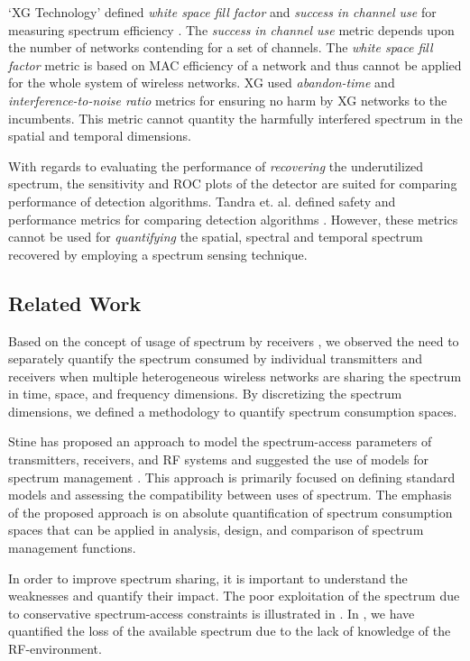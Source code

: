 \documentclass[journal,12pt,draftclsnofoot,onecolumn]{IEEEtran}
\begin{document}
`XG Technology' defined \textit{white space fill factor} and \textit{success in channel use} for measuring spectrum efficiency \cite{xgmetrics}. The \textit{success in channel use} metric depends upon the number of networks contending for a set of channels. The \textit{white space fill factor} metric is based on MAC efficiency of a network and thus cannot be applied for the whole system of wireless networks. XG used \textit{abandon-time} and \textit{interference-to-noise ratio} metrics for ensuring no harm by XG networks to the incumbents. This metric cannot quantity the harmfully interfered spectrum in the spatial and temporal dimensions.

With regards to evaluating the performance of \textit{recovering} the underutilized spectrum, the sensitivity and ROC plots of the detector are suited for comparing performance of detection algorithms. Tandra et. al. defined safety and performance metrics for comparing detection algorithms \cite{tandra_metrics}. However, these metrics cannot be used for \textit{quantifying} the spatial, spectral and temporal spectrum recovered by employing a spectrum sensing technique. 

\subsection{Related Work}
Based on the concept of usage of spectrum by receivers \cite{itumetrics}, we observed the need to separately quantify the spectrum consumed by individual transmitters and receivers when multiple heterogeneous wireless networks are sharing the spectrum in time, space, and frequency dimensions. By discretizing the spectrum dimensions, we defined a methodology to quantify spectrum consumption spaces. 

Stine has proposed an approach to model the spectrum-access parameters of transmitters, receivers, and RF systems and suggested the use of models for spectrum management \cite{crt_stine}. This approach is primarily focused on defining standard models and assessing the compatibility between uses of spectrum. The emphasis of the proposed approach is on absolute quantification of spectrum consumption spaces that can be applied in analysis, design, and comparison of spectrum management functions.

In order to improve spectrum sharing, it is important to understand the weaknesses and quantify their impact. The poor exploitation of the spectrum due to conservative spectrum-access constraints is illustrated in \cite{berk_wsc}. In \cite{oms2_sca}, we have quantified the loss of the available spectrum due to the lack of knowledge of the RF-environment. 
\end{document}
